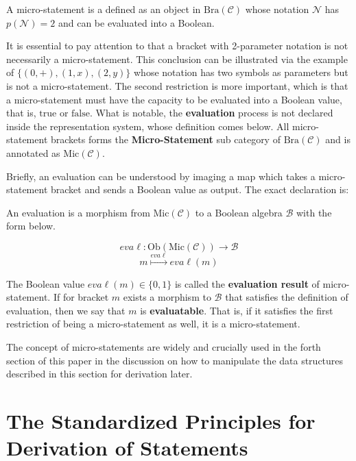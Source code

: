 \documentclass{article}
\begin{document}
 A micro-statement is a defined as an object in \(\text{Bra}(\mathcal{C})\) whose notation \(\mathcal{N}\) has \(\mathit{p}(\mathcal{N})=2\) and can be evaluated into a Boolean.

It is essential to pay attention to that a bracket with 2-parameter notation is not necessarily a micro-statement. This conclusion can be illustrated via the example of \(\{(0,+),(1,x),(2,y)\}\) whose notation has two symbols as parameters but is not a micro-statement. The second restriction is more important, which is that a micro-statement must have the capacity to be evaluated into a Boolean value, that is, \(\text{true}\) or \(\text{false}\). What is notable, the \textbf{ evaluation} process is not declared inside the representation system, whose definition comes below. All micro-statement brackets forms the \textbf{ Micro-Statement }sub category of \(\text{Bra}(\mathcal{C})\) and is annotated as \(\text{Mic}(\mathcal{C})\).

 Briefly, an evaluation can be understood by imaging a map which takes a micro-statement bracket and sends a Boolean value as output. The exact declaration is:

 An evaluation is a morphism from \(\text{Mic}(\mathcal{C})\) to a Boolean algebra \(\mathcal{B}\) with the form below.

\[\mathit{e}\mathit{v}\mathit{a}\ell :\text{Ob}(\text{Mic}(\mathcal{C}))\to \mathcal{B}\]
\[\mathit{m}\overset{\mathit{e}\mathit{v}\mathit{a}\ell }{\mapsto }\mathit{e}\mathit{v}\mathit{a}\ell (\mathit{m})\]

The Boolean value \(\mathit{e}\mathit{v}\mathit{a}\ell (\mathit{m})\in \{0,1\}\) is called the \textbf{ evaluation result} of micro-statement. If for bracket \(\mathit{m}\) exists a morphism to \(\mathcal{B}\) that satisfies the definition of evaluation, then we say that \(\mathit{m}\) is \textbf{ evaluatable}. That is, if it satisfies the first restriction of being a micro-statement as well, it is a micro-statement.

The concept of micro-statements are widely and crucially used in the forth section of this paper in the discussion on how to manipulate the data structures described in this section for derivation later.

\section*{The Standardized Principles for Derivation of Statements}
\end{document}
